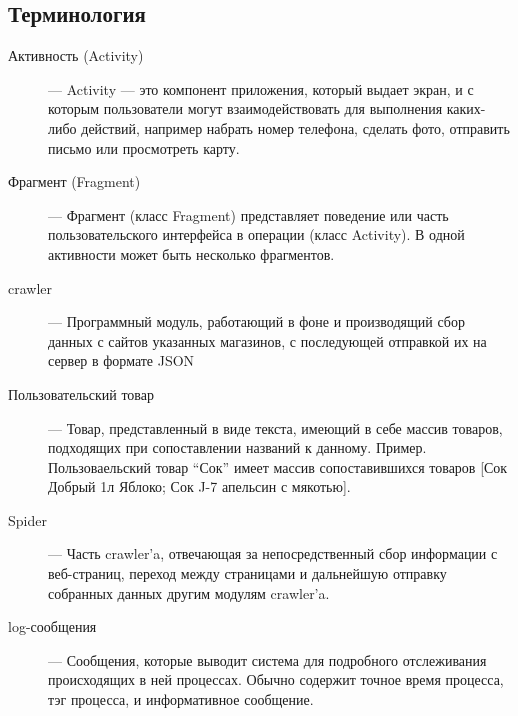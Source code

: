 \subsection{Терминология}
\begin{description}
    \item[Активность (Activity)] ---
        Activity — это компонент приложения, который выдает экран, и с которым
        пользователи могут взаимодействовать для выполнения каких-либо
        действий, например набрать номер телефона, сделать фото, отправить
        письмо или просмотреть карту. 

    \item[Фрагмент (Fragment)] ---
        Фрагмент (класс Fragment) представляет поведение или часть
        пользовательского интерфейса в операции (класс Activity). В одной
        активности может быть несколько фрагментов.

    \item[crawler] ---
            Программный модуль, работающий в фоне и производящий сбор данных с сайтов
            указанных магазинов, с последующей отправкой их на сервер в формате
            JSON

    \item[Пользовательский товар] ---
            Товар, представленный в виде текста, имеющий в себе массив товаров,
            подходящих при сопоставлении названий к данному. Пример.
            Пользоваельский товар ``Сок'' имеет массив сопоставившихся товаров [Сок
            Добрый 1л Яблоко; Сок J-7 апельсин с мякотью].

    \item[Spider] ---
        Часть crawler'a, отвечающая за непосредственный сбор информации с
        веб-страниц, переход между страницами и дальнейшую отправку собранных
        данных другим модулям crawler'a.

    \item[log-сообщения] ---
        Сообщения, которые выводит система для подробного отслеживания
        происходящих в ней процессах. Обычно содержит точное время процесса,
        тэг процесса, и информативное сообщение.

\end{description}

